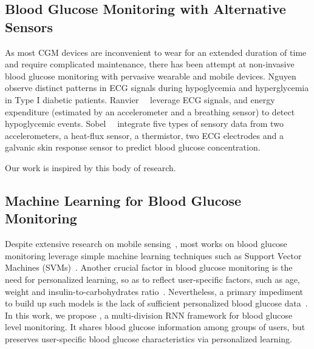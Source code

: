 \subsection{Blood Glucose Monitoring with Alternative Sensors}
As most CGM devices are inconvenient to wear for an extended duration of time and require complicated maintenance, there has been attempt at non-invasive blood glucose monitoring with pervasive wearable and mobile devices.
Nguyen~\etal~\cite{bib:EMBC12:Nguyen} observe distinct patterns in ECG signals during hypoglycemia and hyperglycemia in Type I diabetic patients.
Ranvier~\etal~\cite{bib:SEMPER16:Ranvier} leverage ECG signals, and energy expenditure (estimated by an accelerometer and a breathing sensor) to detect hypoglycemic events.
Sobel~\etal~\cite{bib:JDST14:Sobel} integrate five types of sensory data from two accelerometers, a heat-flux sensor, a thermistor, two ECG electrodes and a galvanic skin response sensor to predict blood glucose concentration.

Our work is inspired by this body of research.

\subsection{Machine Learning for Blood Glucose Monitoring}
Despite extensive research on mobile sensing~\cite{bib:COMMAG10:Lane10}, most works on blood glucose monitoring leverage simple machine learning techniques such as Support Vector Machines (SVMs)~\cite{bib:MAIHA14:Plis}.
Another crucial factor in blood glucose monitoring is the need for personalized learning, so as to reflect user-specific factors, such as age, weight and insulin-to-carbohydrates ratio~\cite{bib:IJNMBE16:Oviedo}.
Nevertheless, a primary impediment to build up such models is the lack of sufficient personalized blood glucose data~\cite{bib:KDHealth16:Marling}.
In this work, we propose \modelname, a multi-division RNN framework for blood glucose level monitoring.
It shares blood glucose information among groups of users, but preserves user-specific blood glucose characteristics via personalized learning.



